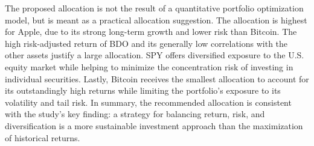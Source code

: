 The proposed allocation is not the result of a quantitative portfolio optimization model, but is meant as a practical allocation suggestion. The allocation is highest for Apple, due to its strong long-term growth and lower risk than Bitcoin. The high risk-adjusted return of BDO and its generally low correlations with the other assets justify a large allocation. SPY offers diversified exposure to the U.S. equity market while helping to minimize the concentration risk of investing in individual securities. Lastly, Bitcoin receives the smallest allocation to account for its outstandingly high returns while limiting the portfolio's exposure to its volatility and tail risk. In summary, the recommended allocation is consistent with the study's key finding: a strategy for balancing return, risk, and diversification is a more sustainable investment approach than the maximization of historical returns.

